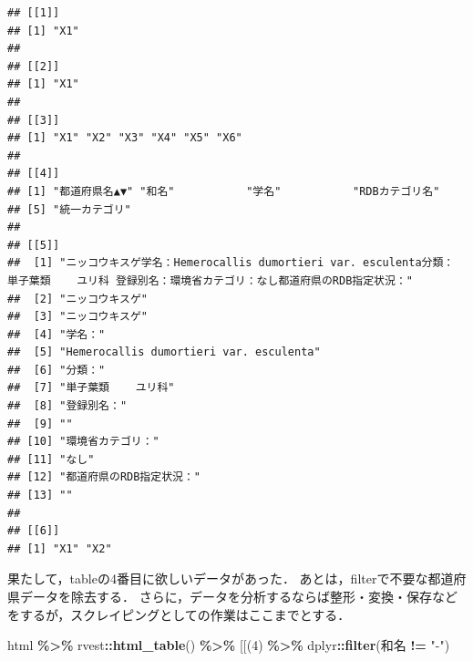 \documentclass[
]{article}
\newenvironment{Shaded}{\begin{snugshade}}{\end{snugshade}}
\newcommand{\AttributeTok}[1]{\textcolor[rgb]{0.13,0.29,0.53}{#1}}
\newcommand{\DecValTok}[1]{\textcolor[rgb]{0.00,0.00,0.81}{#1}}
\newcommand{\FunctionTok}[1]{\textcolor[rgb]{0.13,0.29,0.53}{\textbf{#1}}}
\newcommand{\NormalTok}[1]{#1}
\newcommand{\SpecialCharTok}[1]{\textcolor[rgb]{0.81,0.36,0.00}{\textbf{#1}}}
\newcommand{\StringTok}[1]{\textcolor[rgb]{0.31,0.60,0.02}{#1}}
\begin{document}
\begin{verbatim}
## [[1]]
## [1] "X1"
## 
## [[2]]
## [1] "X1"
## 
## [[3]]
## [1] "X1" "X2" "X3" "X4" "X5" "X6"
## 
## [[4]]
## [1] "都道府県名▲▼" "和名"           "学名"           "RDBカテゴリ名" 
## [5] "統一カテゴリ"  
## 
## [[5]]
##  [1] "ニッコウキスゲ学名：Hemerocallis dumortieri var. esculenta分類： 単子葉類    ユリ科 登録別名：環境省カテゴリ：なし都道府県のRDB指定状況："
##  [2] "ニッコウキスゲ"                                                                                                                           
##  [3] "ニッコウキスゲ"                                                                                                                           
##  [4] "学名："                                                                                                                                   
##  [5] "Hemerocallis dumortieri var. esculenta"                                                                                                   
##  [6] "分類："                                                                                                                                   
##  [7] "単子葉類    ユリ科"                                                                                                                       
##  [8] "登録別名："                                                                                                                               
##  [9] ""                                                                                                                                         
## [10] "環境省カテゴリ："                                                                                                                         
## [11] "なし"                                                                                                                                     
## [12] "都道府県のRDB指定状況："                                                                                                                  
## [13] ""                                                                                                                                         
## 
## [[6]]
## [1] "X1" "X2"
\end{verbatim}

果たして，tableの4番目に欲しいデータがあった．
あとは，filterで不要な都道府県データを除去する．
さらに，データを分析するならば整形・変換・保存などをするが，スクレイピングとしての作業はここまでとする．

\begin{Shaded}
\begin{Highlighting}[]
\NormalTok{html }\SpecialCharTok{\%\textgreater{}\%}
\NormalTok{  rvest}\SpecialCharTok{::}\FunctionTok{html\_table}\NormalTok{() }\SpecialCharTok{\%\textgreater{}\%}
  \StringTok{\textasciigrave{}}\AttributeTok{[[}\StringTok{\textasciigrave{}}\NormalTok{(}\DecValTok{4}\NormalTok{) }\SpecialCharTok{\%\textgreater{}\%}
\NormalTok{  dplyr}\SpecialCharTok{::}\FunctionTok{filter}\NormalTok{(和名 }\SpecialCharTok{!=} \StringTok{"{-}"}\NormalTok{)}
\end{Highlighting}
\end{Shaded}
\end{document}
